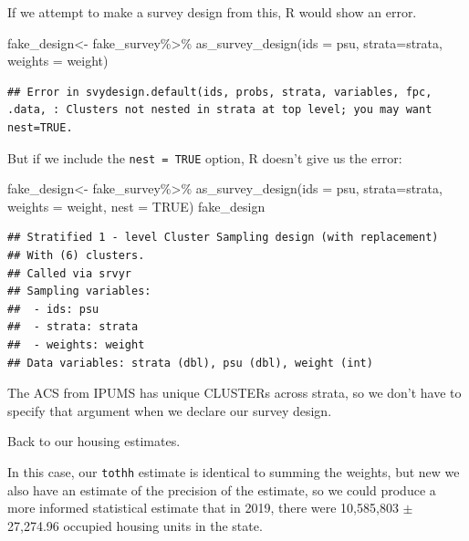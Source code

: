 \documentclass[
]{article}
\newenvironment{Shaded}{\begin{snugshade}}{\end{snugshade}}
\newcommand{\AttributeTok}[1]{\textcolor[rgb]{0.77,0.63,0.00}{#1}}
\newcommand{\ConstantTok}[1]{\textcolor[rgb]{0.00,0.00,0.00}{#1}}
\newcommand{\FunctionTok}[1]{\textcolor[rgb]{0.00,0.00,0.00}{#1}}
\newcommand{\NormalTok}[1]{#1}
\newcommand{\OtherTok}[1]{\textcolor[rgb]{0.56,0.35,0.01}{#1}}
\newcommand{\SpecialCharTok}[1]{\textcolor[rgb]{0.00,0.00,0.00}{#1}}
\begin{document}
If we attempt to make a survey design from this, R would show an error.

\begin{Shaded}
\begin{Highlighting}[]
\NormalTok{fake\_design}\OtherTok{\textless{}{-}}\NormalTok{ fake\_survey}\SpecialCharTok{\%\textgreater{}\%}
  \FunctionTok{as\_survey\_design}\NormalTok{(}\AttributeTok{ids =}\NormalTok{ psu,}
                    \AttributeTok{strata=}\NormalTok{strata,}
                    \AttributeTok{weights =}\NormalTok{ weight)}
\end{Highlighting}
\end{Shaded}

\begin{verbatim}
## Error in svydesign.default(ids, probs, strata, variables, fpc, .data, : Clusters not nested in strata at top level; you may want nest=TRUE.
\end{verbatim}

But if we include the \texttt{nest\ =\ TRUE} option, R doesn't give us the error:

\begin{Shaded}
\begin{Highlighting}[]
\NormalTok{fake\_design}\OtherTok{\textless{}{-}}\NormalTok{ fake\_survey}\SpecialCharTok{\%\textgreater{}\%}
  \FunctionTok{as\_survey\_design}\NormalTok{(}\AttributeTok{ids =}\NormalTok{ psu,}
                  \AttributeTok{strata=}\NormalTok{strata,}
                  \AttributeTok{weights =}\NormalTok{ weight, }
                  \AttributeTok{nest =} \ConstantTok{TRUE}\NormalTok{)}
\NormalTok{fake\_design}
\end{Highlighting}
\end{Shaded}

\begin{verbatim}
## Stratified 1 - level Cluster Sampling design (with replacement)
## With (6) clusters.
## Called via srvyr
## Sampling variables:
##  - ids: psu
##  - strata: strata
##  - weights: weight
## Data variables: strata (dbl), psu (dbl), weight (int)
\end{verbatim}

The ACS from IPUMS has unique CLUSTERs across strata, so we don't have to specify that argument when we declare our survey design.

Back to our housing estimates.

In this case, our \texttt{tothh} estimate is identical to summing the weights, but new we also have an estimate of the precision of the estimate, so we could produce a more informed statistical estimate that in 2019, there were 10,585,803 \(\pm\) 27,274.96 occupied housing units in the state.
\end{document}
